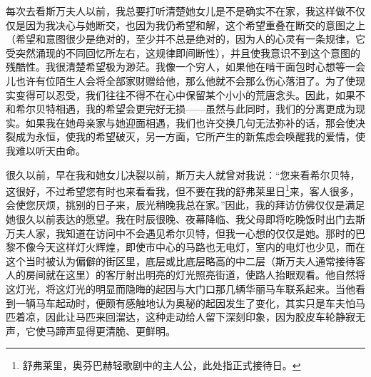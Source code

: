 \par 每次去看斯万夫人以前，我总要打听清楚她女儿是不是确实不在家，我这样做不仅仅是因为我决心与她断交，也因为我仍希望和解，这个希望重叠在断交的意图之上（希望和意图很少是绝对的，至少并不总是绝对的，因为人的心灵有一条规律，它受突然涌现的不同回忆所左右，这规律即间断性），并且使我意识不到这个意图的残酷性。我很清楚希望极为渺茫。我像一个穷人，如果他在啃干面包时心想等一会儿也许有位陌生人会将全部家财赠给他，那么他就不会那么伤心落泪了。为了使现实变得可以忍受，我们往往不得不在心中保留某个小小的荒唐念头。因此，如果不和希尔贝特相遇，我的希望会更完好无损——虽然与此同时，我们的分离更成为现实。如果我在她母亲家与她迎面相遇，我们也许交换几句无法弥补的话，那会使决裂成为永恒，使我的希望破灭，另一方面，它所产生的新焦虑会唤醒我的爱情，使我难以听天由命。
\par 很久以前，早在我和她女儿决裂以前，斯万夫人就曾对我说：“您来看希尔贝特，这很好，不过希望您有时也来看看我，但不要在我的舒弗莱里日\footnote{舒弗莱里，奥芬巴赫轻歌剧中的主人公，此处指正式接待日。}来，客人很多，会使您厌烦，挑别的日子来，辰光稍晚我总在家。”因此，我的拜访仿佛仅仅是满足她很久以前表达的愿望。我在时辰很晚、夜幕降临、我父母即将吃晚饭时出门去斯万夫人家，我知道在访问中不会遇见希尔贝特，但我一心想的仅仅是她。那时的巴黎不像今天这样灯火辉煌，即使市中心的马路也无电灯，室内的电灯也少见，而在这个当时被认为偏僻的街区里，底层或比底层略高的中二层（斯万夫人通常接待客人的房间就在这里）的客厅射出明亮的灯光照亮街道，使路人抬眼观看。他自然将这灯光，将这灯光的明显而隐晦的起因与大门口那几辆华丽马车联系起来。当他看到一辆马车起动时，便颇有感触地认为奥秘的起因发生了变化，其实只是车夫怕马匹着凉，因此让马匹来回溜达，这种走动给人留下深刻印象，因为胶皮车轮静寂无声，它使马蹄声显得更清脆、更鲜明。
